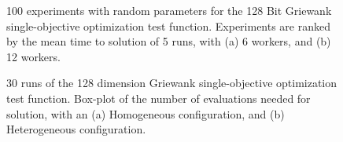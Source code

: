 \documentclass{llncs}
\begin{document}
\begin{figure}[t]
    \centering

    \caption{100 experiments with random parameters for the 128 Bit Griewank 
    single-objective optimization test function. Experiments are ranked by 
    the mean time to solution of 5 runs, with (a) 6 workers, and (b) 12 workers.}
    \label{fig:griewank}
\end{figure}


\begin{figure}[t]
    \centering
      \caption{30 runs of the 128 dimension Griewank single-objective optimization test function. 
    Box-plot of the number of evaluations needed for solution, with an (a) Homogeneous configuration, and (b) Heterogeneous configuration.}
    \label{fig:griewank-evals}
\end{figure}
\end{document}
